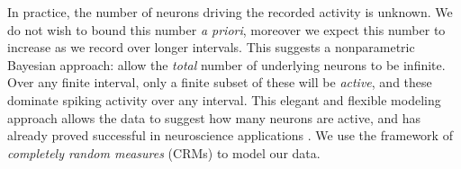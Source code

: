 In practice, the number of neurons driving the recorded activity is unknown. We do not wish to bound this number \emph{a priori}, 
moreover we expect this number to increase as we 
record over longer intervals. This suggests a nonparametric Bayesian approach: allow the \emph{total} 
number of underlying neurons to be infinite.
Over any finite interval, only a finite subset of these will be \emph{active}, and these dominate spiking activity over any interval.
This elegant and flexible modeling approach allows the data to suggest how many neurons are active, and has already proved 
successful in neuroscience applications \citep{WoodBla2008}.
% 
% 
We use the framework of \emph{completely random measures} (CRMs) \citep{Kingman:PJM67} to model our data.
